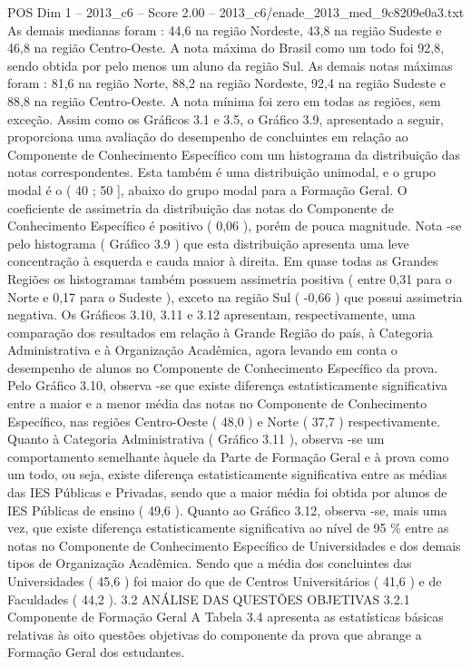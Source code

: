 \begin{textsample}{POS Dim 1 – 2013\_c6 – Score 2.00 – 2013\_c6/enade\_2013\_med\_9c8209e0a3.txt}
As demais medianas foram : 44,6 na região Nordeste, 43,8 na região Sudeste e 46,8 na região Centro-Oeste.
A nota máxima do Brasil como um todo foi 92,8, sendo obtida por pelo menos um aluno da região Sul.
As demais notas máximas foram : 81,6 na região Norte, 88,2 na região Nordeste, 92,4 na região Sudeste e 88,8 na região Centro-Oeste.
A nota mínima foi zero em todas as regiões, sem exceção.
Assim como os Gráficos 3.1 e 3.5, o Gráfico 3.9, apresentado a seguir, proporciona uma avaliação do desempenho de concluintes em relação ao Componente de Conhecimento Específico com um histograma da distribuição das notas correspondentes.
Esta também é uma distribuição unimodal, e o grupo modal é o ( 40 ; 50 ], abaixo do grupo modal para a Formação Geral.
O coeficiente de assimetria da distribuição das notas do Componente de Conhecimento Específico é positivo ( 0,06 ), porém de pouca magnitude.
Nota -se pelo histograma ( Gráfico 3.9 ) que esta distribuição apresenta uma leve concentração à esquerda e cauda maior à direita.
Em quase todas as Grandes Regiões os histogramas também possuem assimetria positiva ( entre 0,31 para o Norte e 0,17 para o Sudeste ), exceto na região Sul ( -0,66 ) que possui assimetria negativa.
Os Gráficos 3.10, 3.11 e 3.12 apresentam, respectivamente, uma comparação dos resultados em relação à Grande Região do país, à Categoria Administrativa e à Organização Acadêmica, agora levando em conta o desempenho de alunos no Componente de Conhecimento Específico da prova.
Pelo Gráfico 3.10, observa -se que existe diferença estatisticamente significativa entre a maior e a menor média das notas no Componente de Conhecimento Específico, nas regiões Centro-Oeste ( 48,0 ) e Norte ( 37,7 ) respectivamente.
Quanto à Categoria Administrativa ( Gráfico 3.11 ), observa -se um comportamento semelhante àquele da Parte de Formação Geral e à prova como um todo, ou seja, existe diferença estatisticamente significativa entre as médias das IES Públicas e Privadas, sendo que a maior média foi obtida por alunos de IES Públicas de ensino ( 49,6 ).
Quanto ao Gráfico 3.12, observa -se, mais uma vez, que existe diferença estatisticamente significativa ao nível de 95 \% entre as notas no Componente de Conhecimento Específico de Universidades e dos demais tipos de Organização Acadêmica.
Sendo que a média dos concluintes das Universidades ( 45,6 ) foi maior do que de Centros Universitários ( 41,6 ) e de Faculdades ( 44,2 ). 3.2 ANÁLISE DAS QUESTÕES OBJETIVAS 3.2.1 Componente de Formação Geral A Tabela 3.4 apresenta as estatísticas básicas relativas às oito questões objetivas do componente da prova que abrange a Formação Geral dos estudantes.

\end{textsample}
